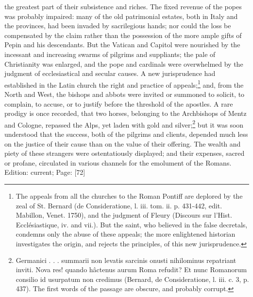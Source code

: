 the greatest part of their subsistence and riches. The fixed revenue of the popes was probably impaired: many of the old patrimonial estates, both in Italy and the provinces, had been invaded by sacrilegious hands; nor could the loss be compensated by the claim rather than the possession of the more ample gifts of Pepin and his descendants. But the Vatican and Capitol were nourished by the incessant and increasing swarms of pilgrims and suppliants; the pale of Christianity was enlarged, and the pope and cardinals were overwhelmed by the judgment of ecclesiastical and secular causes. A new jurisprudence had established in the Latin church the right and practice of appeals;\footnote{The appeals from all the churches to the Roman Pontiff are deplored by the zeal of St. Bernard (de Consideratione, l. iii. tom. ii. p. 431-442, edit. Mabillon, Venet. 1750), and the judgment of Fleury (Discours sur l\texthebrew{}’Hist. Ecclésiastique, iv. and vii.). But the saint, who believed in the false decretals, condemns only the abuse of these appeals; the more enlightened historian investigates the origin, and rejects the principles, of this new jurisprudence.} and, from the North and West, the bishops and abbots were invited or summoned to solicit, to complain, to accuse, or to justify before the threshold of the apostles. A rare prodigy is once recorded, that two horses, belonging to the Archbishops of Mentz and Cologne, repassed the Alps, yet laden with gold and silver;\footnote{Germanici . . . summarii non levatis sarcinis onusti nihilominus repatriant inviti. Nova res! quando hâctenus aurum Roma refudit? Et nunc Romanorum consilio id usurpatum non credimus (Bernard, de Consideratione, l. iii. c. 3, p. 437). The first words of the passage are obscure, and probably corrupt.} but it was soon understood that the success, both of the pilgrims and clients, depended much less on the justice of their cause than on the value of their offering. The wealth and piety of these strangers were ostentatiously displayed; and their expenses, sacred or profane, circulated in various channels for the emolument of the Romans.
Edition: current; Page: [72]

